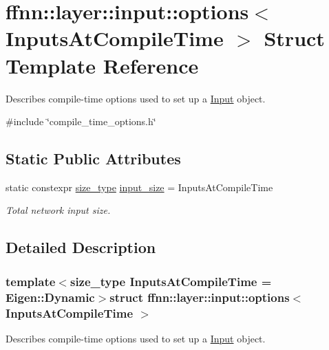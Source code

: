 \hypertarget{structffnn_1_1layer_1_1input_1_1options}{\section{ffnn\-:\-:layer\-:\-:input\-:\-:options$<$ Inputs\-At\-Compile\-Time $>$ Struct Template Reference}
\label{structffnn_1_1layer_1_1input_1_1options}
}


Describes compile-\/time options used to set up a \hyperlink{classffnn_1_1layer_1_1_input}{Input} object.  




{\ttfamily \#include \char`\"{}compile\-\_\-time\-\_\-options.\-h\char`\"{}}

\subsection*{Static Public Attributes}
\begin{DoxyCompactItemize}
\item 
static constexpr \hyperlink{namespaceffnn_a63b90a2fd70eb76684eac482a51633e5}{size\-\_\-type} \hyperlink{structffnn_1_1layer_1_1input_1_1options_a3d31a36c926c1926e653e5e19e034b82}{input\-\_\-size} = Inputs\-At\-Compile\-Time
\begin{DoxyCompactList}\small\item\em Total network input size. \end{DoxyCompactList}\end{DoxyCompactItemize}


\subsection{Detailed Description}
\subsubsection*{template$<$size\-\_\-type Inputs\-At\-Compile\-Time = Eigen\-::\-Dynamic$>$struct ffnn\-::layer\-::input\-::options$<$ Inputs\-At\-Compile\-Time $>$}

Describes compile-\/time options used to set up a \hyperlink{classffnn_1_1layer_1_1_input}{Input} object. 

